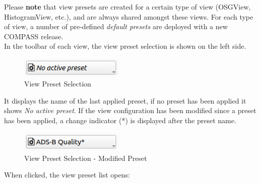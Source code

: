 Please \textbf{note} that view presets are created for a certain type of view (OSGView, HistogramView, etc.),
and are always shared amongst these views. For each type of view, a number of pre-defined \textit{default presets} are deployed with a new COMPASS release. \\

In the toolbar of each view, the view preset selection is shown on the left side. 

\begin{figure}[H]
    \center
    \includegraphics[width=5cm,frame]{figures/view_preset_selection.png}
  \caption{View Preset Selection}
\end{figure}

It displays the name of the last applied preset, if no preset has been applied it shows \textit{No active preset}.
If the view configuration has been modified since a preset has been applied, a change indicator (*) is displayed after the preset name.

\begin{figure}[H]
    \center
    \includegraphics[width=5cm,frame]{figures/view_preset_selection_modified.png}
  \caption{View Preset Selection - Modified Preset}
\end{figure}

When clicked, the view preset list opens:

